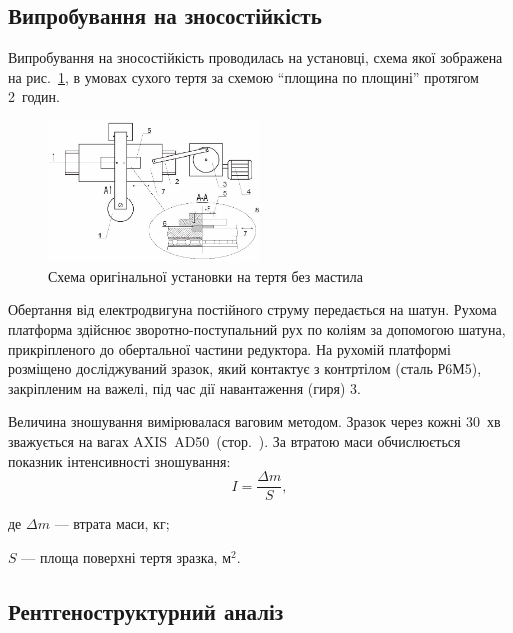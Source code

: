 \documentclass[a4paper,fontsize=14bp,ukrainian]{extreport}
\begin{document}
\subsection{Випробування на зносостійкість}
\label{subsec:wear_resisting_analysis}

Випробування на зносостійкість проводилась на установці, схема якої зображена на рис.~\ref{fig:schema_original_set}, в умовах сухого тертя за схемою ``площина по площині'' протягом 2~годин.

\begin{figure}[H]
\centering
\includegraphics[width=0.5\textwidth]{schema_original_set.png}
\caption{Схема оригінальної установки на тертя без мастила}
\label{fig:schema_original_set}
\end{figure}
Обертання від електродвигуна постійного струму передається на шатун. Рухома платформа здійснює зворотно-поступальний рух по коліям за допомогою шатуна, прикріпленого до обертальної частини редуктора. На рухомій платформі розміщено досліджуваний зразок, який контактує з контртілом (сталь Р6М5), закріпленим на важелі, під час дії навантаження (гиря) \SI{3}{\kilog}.

Величина зношування вимірювалася ваговим методом. Зразок через кожні 30~хв зважується на вагах AXIS~AD50~(стор.~\pageref{subsec:method_gravi}). За втратою маси обчислюється показник інтенсивності зношування:
\begin{equation}
I = \frac{\Delta m}{S},
\label{eq:wear_intensity_coef}
\end{equation}
\begin{eqitemize}
\item[де] $\Delta m$ --- втрата маси, кг;
\item $S$ --- площа поверхні тертя зразка, $\text{м}^2$.
\end{eqitemize}

\subsection{Рентгеноструктурний аналіз}
\label{subsec:rentgen}
\end{document}
